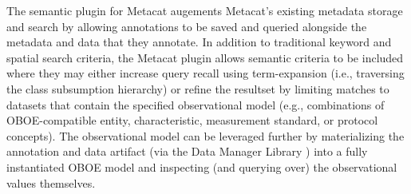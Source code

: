   The semantic plugin for Metacat
augements Metacat's existing metadata storage and search by allowing
annotations to be saved and queried alongside the metadata and data
that they annotate. In addition to traditional keyword and spatial
search criteria, the Metacat plugin allows semantic criteria to be
included where they may either increase query recall using
term-expansion (i.e., traversing the class subsumption hierarchy) or
refine the resultset by limiting matches to datasets that contain the
specified observational model (e.g., combinations of OBOE-compatible
entity, characteristic, measurement standard, or protocol
concepts). The observational model can be leveraged further by
materializing the annotation and data artifact (via the Data Manager
Library \cite{leinfelder10:_metad_driven_approac_to_loadin}) into a
fully instantiated OBOE model and inspecting (and querying over) the
observational values themselves.

